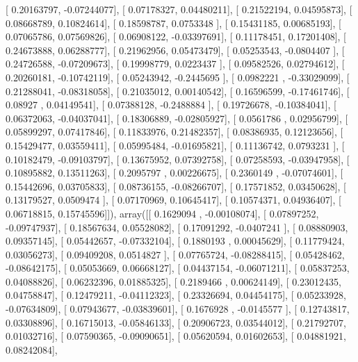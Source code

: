 \documentclass{article}
\begin{document}
       [ 0.20163797, -0.07244077],
       [ 0.07178327,  0.04480211],
       [ 0.21522194,  0.04595873],
       [ 0.08668789,  0.10824614],
       [ 0.18598787,  0.0753348 ],
       [ 0.15431185,  0.00685193],
       [ 0.07065786,  0.07569826],
       [ 0.06908122, -0.03397691],
       [ 0.11178451,  0.17201408],
       [ 0.24673888,  0.06288777],
       [ 0.21962956,  0.05473479],
       [ 0.05253543, -0.0804407 ],
       [ 0.24726588, -0.07209673],
       [ 0.19998779,  0.0223437 ],
       [ 0.09582526,  0.02794612],
       [ 0.20260181, -0.10742119],
       [ 0.05243942, -0.2445695 ],
       [ 0.0982221 , -0.33029099],
       [ 0.21288041, -0.08318058],
       [ 0.21035012,  0.00140542],
       [ 0.16596599, -0.17461746],
       [ 0.08927   ,  0.04149541],
       [ 0.07388128, -0.2488884 ],
       [ 0.19726678, -0.10384041],
       [ 0.06372063, -0.04037041],
       [ 0.18306889, -0.02805927],
       [ 0.0561786 ,  0.02956799],
       [ 0.05899297,  0.07417846],
       [ 0.11833976,  0.21482357],
       [ 0.08386935,  0.12123656],
       [ 0.15429477,  0.03559411],
       [ 0.05995484, -0.01695821],
       [ 0.11136742,  0.0793231 ],
       [ 0.10182479, -0.09103797],
       [ 0.13675952,  0.07392758],
       [ 0.07258593, -0.03947958],
       [ 0.10895882,  0.13511263],
       [ 0.2095797 ,  0.00226675],
       [ 0.2360149 , -0.07074601],
       [ 0.15442696,  0.03705833],
       [ 0.08736155, -0.08266707],
       [ 0.17571852,  0.03450628],
       [ 0.13179527,  0.0509474 ],
       [ 0.07170969,  0.10645417],
       [ 0.10574371,  0.04936407],
       [ 0.06718815,  0.15745596]]), array([[ 0.1629094 , -0.00108074],
       [ 0.07897252, -0.09747937],
       [ 0.18567634,  0.05528082],
       [ 0.17091292, -0.0407241 ],
       [ 0.08880903,  0.09357145],
       [ 0.05442657, -0.07332104],
       [ 0.1880193 ,  0.00045629],
       [ 0.11779424,  0.03056273],
       [ 0.09409208,  0.0514827 ],
       [ 0.07765724, -0.08288415],
       [ 0.05428462, -0.08642175],
       [ 0.05053669,  0.06668127],
       [ 0.04437154, -0.06071211],
       [ 0.05837253,  0.04088826],
       [ 0.06232396,  0.01885325],
       [ 0.2189466 ,  0.00624149],
       [ 0.23012435,  0.04758847],
       [ 0.12479211, -0.04112323],
       [ 0.23326694,  0.04454175],
       [ 0.05233928, -0.07634809],
       [ 0.07943677, -0.03839601],
       [ 0.1676928 , -0.0145577 ],
       [ 0.12743817,  0.03308896],
       [ 0.16715013, -0.05846133],
       [ 0.20906723,  0.03544012],
       [ 0.21792707,  0.01032716],
       [ 0.07590365, -0.09090651],
       [ 0.05620594,  0.01602653],
       [ 0.04881921,  0.08242084],
\end{document}
